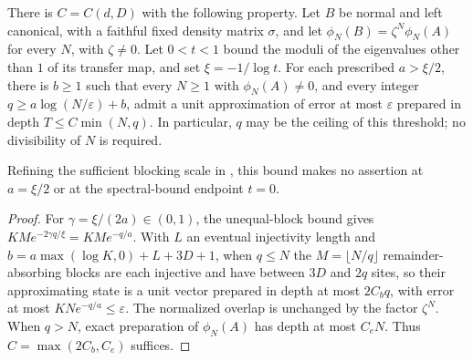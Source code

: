 \begin{lemma}
    \label{thm:ldp_all_length_prescribed_slope}
    \leanok
    There is $C=C(d,D)$ with the following property. Let $B$ be normal and
    left canonical, with a faithful fixed density matrix $\sigma$, and let
    $\phi_N(B)=\zeta^N\phi_N(A)$ for every $N$, with $\zeta\ne0$.
    Let $0<t<1$ bound the moduli of the eigenvalues other than $1$ of
    its transfer map, and set $\xi=-1/\log t$. For each prescribed
    $a>\xi/2$, there is $b\ge1$ such that every $N\ge1$ with
    $\phi_N(A)\ne0$, and every integer $q\ge a\log(N/\varepsilon)+b$,
    admit a unit approximation of error at most $\varepsilon$ prepared
    in depth $T\le C\min(N,q)$. In particular, $q$ may be the ceiling
    of this threshold; no divisibility of $N$ is required.

    Refining the sufficient blocking scale in
    \cite{Malz2024Preparation}, this bound makes no assertion at $a=\xi/2$ or
    at the spectral-bound endpoint $t=0$.
\end{lemma}
\begin{proof}
    \leanok
    For $\gamma=\xi/(2a)\in(0,1)$, the unequal-block bound gives
    $KMe^{-2\gamma q/\xi}=KMe^{-q/a}$. With $L$ an eventual injectivity
    length and $b=a\max(\log K,0)+L+3D+1$, when $q\le N$ the
    $M=\lfloor N/q\rfloor$ remainder-absorbing blocks are each
    injective and have between $3D$ and $2q$ sites, so their approximating
    state is a unit vector prepared in depth at most $2C_bq$, with error
    at most $KNe^{-q/a}\le\varepsilon$. The normalized overlap is unchanged
    by the factor $\zeta^N$. When $q>N$, exact preparation of $\phi_N(A)$
    has depth at most $C_eN$. Thus $C=\max(2C_b,C_e)$ suffices.
\end{proof}
